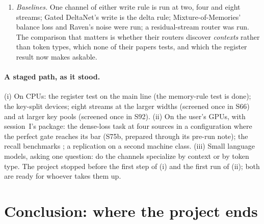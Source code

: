 \documentclass[11pt]{article}
\begin{document}
\begin{enumerate}
\item \emph{Baselines.} One channel of either write rule is run at two, four and eight streams; Gated DeltaNet's write is the delta rule; Mixture-of-Memories' balance loss and Raven's noise were run; a residual-stream router was run. The comparison that matters is whether their routers discover \emph{contexts} rather than token types, which none of their papers tests, and which the register result now makes askable.
\end{enumerate}

\paragraph{A staged path, as it stood.} (i) On CPUs: the register test on the main line (the memory-rule test is done); the key-split devices; eight streams at the larger widths (screened once in S66) and at larger key pools (screened once in S92). (ii) On the user's GPUs, with session~I's package: the dense-loss task at four sources in a configuration where the perfect gate reaches its bar (S75b, prepared through its pre-run note); the recall benchmarks \cite{zoology}; a replication on a second machine class. (iii) Small language models, asking one question: do the channels specialize by context or by token type. The project stopped before the first step of (i) and the first run of (ii); both are ready for whoever takes them up.

\section{Conclusion: where the project ends}
\end{document}
